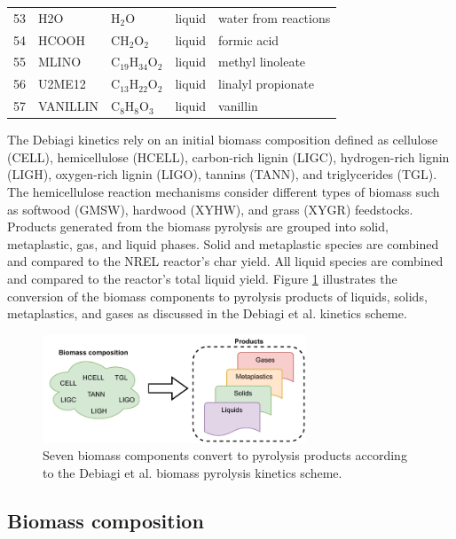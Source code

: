 \begin{center}
\begin{longtable}{cllll}
    53 & H2O            & H$_2$O                  & \cellcolor{blue!25}liquid        & water from reactions \\
    54 & HCOOH          & CH$_2$O$_2$             & \cellcolor{blue!25}liquid        & formic acid \\
    55 & MLINO          & C$_{19}$H$_{34}$O$_2$   & \cellcolor{blue!25}liquid        & methyl linoleate \\
    56 & U2ME12         & C$_{13}$H$_{22}$O$_2$   & \cellcolor{blue!25}liquid        & linalyl propionate \\
    57 & VANILLIN       & C$_8$H$_8$O$_3$         & \cellcolor{blue!25}liquid        & vanillin \\
    \bottomrule
\end{longtable}
\end{center}

The Debiagi kinetics rely on an initial biomass composition defined as cellulose (CELL), hemicellulose (HCELL), carbon-rich lignin (LIGC), hydrogen-rich lignin (LIGH), oxygen-rich lignin (LIGO), tannins (TANN), and triglycerides (TGL). The hemicellulose reaction mechanisms consider different types of biomass such as softwood (GMSW), hardwood (XYHW), and grass (XYGR) feedstocks. Products generated from the biomass pyrolysis are grouped into solid, metaplastic, gas, and liquid phases. Solid and metaplastic species are combined and compared to the NREL reactor's char yield. All liquid species are combined and compared to the reactor's total liquid yield. Figure \ref{fig:biocomp1} illustrates the conversion of the biomass components to pyrolysis products of liquids, solids, metaplastics, and gases as discussed in the Debiagi et al. kinetics scheme.

\begin{figure}[H]
    \centering
    \includegraphics[width=0.7\textwidth]{figures/biocomp1.pdf}
    \caption{Seven biomass components convert to pyrolysis products according to the Debiagi et al. biomass pyrolysis kinetics scheme.}
    \label{fig:biocomp1}
\end{figure}

\subsection{Biomass composition}

